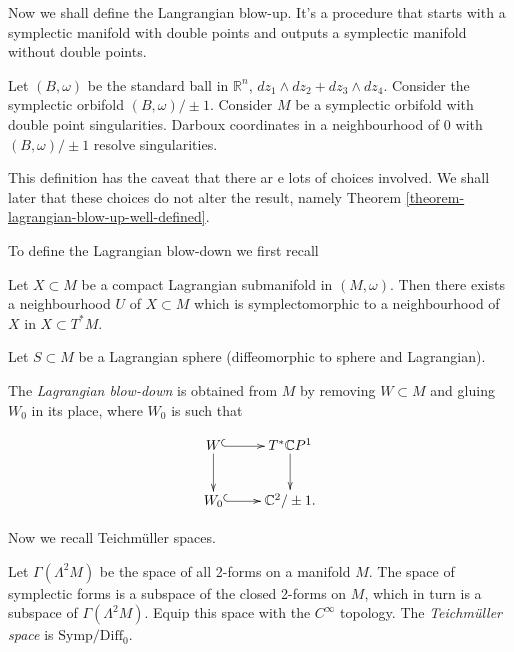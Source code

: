 \medskip\noindent
Now we shall define the Langrangian blow-up.
It's a procedure that starts with a symplectic manifold
with double points and outputs a symplectic manifold
without double points.

\begin{definition}
\label{definition-lagrangian-blow-up}
Let $(B,\omega)$ be the standard ball in $\mathbb{R}^n$,
$dz_1 \wedge dz_2 +dz_3 \wedge dz_4$.
Consider the symplectic orbifold $(B,\omega)/\pm 1$.
Consider $M$ be a symplectic orbifold
with double point singularities.
Darboux coordinates in a neighbourhood of $0$ 
with $(B,\omega)/\pm 1$ resolve singularities.
\end{definition}

This definition has the caveat that there ar e lots of choices involved.
We shall later that these choices do not alter the result,
namely Theorem \ref{theorem-lagrangian-blow-up-well-defined}.

To define the Lagrangian blow-down we first recall

\begin{theorem}
\label{theorem-weinstein-lagrangian-neighbourhood}
Let $X \subset M$ be a compact Lagrangian submanifold in $(M,\omega)$.
Then there exists a neighbourhood $U$ of $X \subset M$
which is symplectomorphic to a neighbourhood of $X$ 
in $X \subset T^*M$.
\end{theorem}

\noindent
Let $S \subset M$ be a Lagrangian sphere (diffeomorphic to sphere
and Lagrangian).

\begin{definition}
\label{definition-lagrangian-blow-down}
The {\it Lagrangian blow-down} is obtained from $M$ 
by removing $W \subset M$ and gluing $W_0$ in its place,
where $W_0$ is such that

$$
\xymatrix{
W \ar@{^{(}->}[r]\ar[d]&T^*\mathbb{C}P^1\ar[d]\\
W_0\ar@{^{(}->}[r]&\mathbb{C}^2/\pm 1.
}
$$
\end{definition}

\medskip\noindent
Now we recall Teichmüller spaces.

Let $\Gamma(\Lambda^2M)$ be the space of all 2-forms on a manifold $M$.
The space of symplectic forms is a subspace of the closed 2-forms on $M$,
which in turn is a subspace of $\Gamma(\Lambda^2M)$.
Equip this space with the $C^\infty$ topology.
The {\it Teichmüller space} is $\text{Symp}/\text{Diff}_0$.


